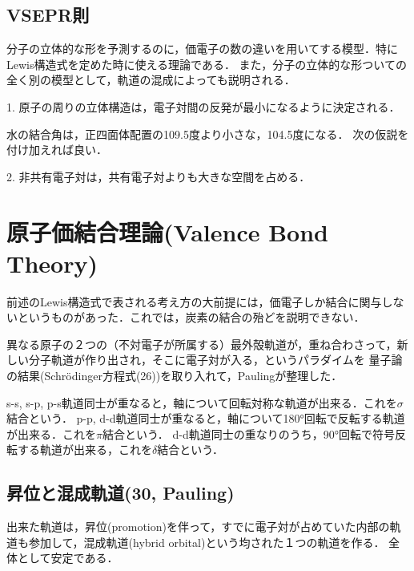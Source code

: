 \documentclass[uplatex, 12pt, dvipdfmx]{jsreport}
\begin{document}
\subsection{VSEPR則}
分子の立体的な形を予測するのに，価電子の数の違いを用いてする模型．特にLewis構造式を定めた時に使える理論である．
また，分子の立体的な形ついての全く別の模型として，軌道の混成によっても説明される．

\begin{model}
    1. 原子の周りの立体構造は，電子対間の反発が最小になるように決定される．
\end{model}

\begin{fact}
    水の結合角は，正四面体配置の109.5度より小さな，104.5度になる．
    次の仮説を付け加えれば良い．
    
    2. 非共有電子対は，共有電子対よりも大きな空間を占める．
\end{fact}

\section{原子価結合理論(Valence Bond Theory)}
前述のLewis構造式で表される考え方の大前提には，価電子しか結合に関与しないというものがあった．これでは，炭素の結合の殆どを説明できない．

異なる原子の２つの（不対電子が所属する）最外殻軌道が，重ね合わさって，新しい分子軌道が作り出され，そこに電子対が入る，というパラダイムを
量子論の結果(Schrödinger方程式(26))を取り入れて，Paulingが整理した．

s-s, s-p, p-s軌道同士が重なると，軸について回転対称な軌道が出来る．これを$\sigma$結合という．
p-p, d-d軌道同士が重なると，軸について180°回転で反転する軌道が出来る．これを$\pi$結合という．
d-d軌道同士の重なりのうち，90°回転で符号反転する軌道が出来る，これを$\delta$結合という．

\subsection{昇位と混成軌道(30, Pauling)}

出来た軌道は，昇位(promotion)を伴って，すでに電子対が占めていた内部の軌道も参加して，混成軌道(hybrid orbital)という均された１つの軌道を作る．
全体として安定である．
\end{document}
